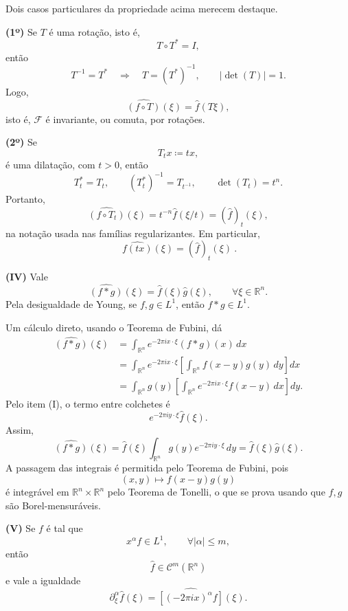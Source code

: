 \documentclass[../distribution_theory_notes.tex]{subfiles}
\begin{document}
\begin{crl*}
	Dois casos particulares da propriedade acima merecem destaque.

	\medskip
	\noindent\textbf{(1º)} Se $T$ é uma rotação, isto é,
	\[
		T\circ T^{*}=I,
	\]
	então
	\[
		T^{-1}=T^{*}
		\quad\Longrightarrow\quad
		T=(T^{*})^{-1},
		\qquad |\det(T)|=1.
	\]
	Logo,
	\[
		\widehat{(f\circ T)}(\xi)=\widehat f(T\xi),
	\]
	isto é, $\mathcal{F}$ é invariante, ou comuta, por rotações.

	\medskip
	\noindent\textbf{(2º)} Se
	\[
		T_{t}x\coloneqq tx,
	\]
	é uma dilatação, com $t>0$, então
	\[
		T_{t}^{*}=T_{t},
		\qquad
		(T_{t}^{*})^{-1}=T_{t^{-1}},
		\qquad
		\det(T_{t})=t^{n}.
	\]
	Portanto,
	\[
		\widehat{(f\circ T_{t})}(\xi)
		=t^{-n}\widehat f(\xi/t)
		=(\widehat f)_{t}(\xi),
	\]
	na notação usada nas famílias regularizantes. Em particular,
	\[
		\boxed{\ \widehat{f(tx)}(\xi)=(\widehat f)_{t}(\xi)\ }.
	\]

	\medskip
	\noindent\textbf{(IV)} Vale
	\[
		\widehat{(f*g)}(\xi)=\widehat f(\xi)\widehat g(\xi),
		\qquad \forall \xi\in\mathbb{R}^{n}.
	\]
	Pela desigualdade de Young, se $f,g\in L^{1}$, então $f*g\in L^{1}$.
\end{crl*}
\begin{proof*}
	Um cálculo direto, usando o Teorema de Fubini, dá
	\begin{align*}
		\widehat{(f*g)}(\xi)
		 & =\int_{\mathbb{R}^{n}}e^{-2\pi i x\cdot\xi}(f*g)(x)\,dx \\
		 & =\int_{\mathbb{R}^{n}}e^{-2\pi i x\cdot\xi}
		\left[\int_{\mathbb{R}^{n}}f(x-y)g(y)\,dy\right]dx         \\
		 & =\int_{\mathbb{R}^{n}}g(y)
		\left[\int_{\mathbb{R}^{n}}e^{-2\pi i x\cdot\xi}f(x-y)\,dx\right]dy.
	\end{align*}
	Pelo item (I), o termo entre colchetes é
	\[
		e^{-2\pi i y\cdot\xi}\widehat f(\xi).
	\]
	Assim,
	\[
		\widehat{(f*g)}(\xi)
		=\widehat f(\xi)
		\int_{\mathbb{R}^{n}}g(y)e^{-2\pi i y\cdot\xi}\,dy
		=\widehat f(\xi)\widehat g(\xi).
	\]
	A passagem das integrais é permitida pelo Teorema de Fubini, pois
	\[
		(x,y)\longmapsto f(x-y)g(y)
	\]
	é integrável em $\mathbb{R}^{n}\times\mathbb{R}^{n}$ pelo Teorema de Tonelli, o que se prova usando que $f,g$ são Borel-mensuráveis. \qedsymbol
\end{proof*}

\medskip
\noindent\textbf{(V)} Se $f$ é tal que
\[
	x^{\alpha}f\in L^{1},
	\qquad \forall |\alpha|\leq m,
\]
então
\[
	\widehat f\in \mathcal{C}^{m}(\mathbb{R}^{n})
\]
e vale a igualdade
\[
	\partial_{\xi}^{\alpha}\widehat f(\xi)
	=\widehat{\left[(-2\pi i x)^{\alpha}f\right]}(\xi).
\]
\end{document}
